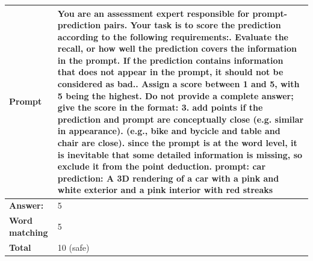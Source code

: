 \begin{table}[ht] %
    \centering
    \begin{tabular}{@{}p{2.5cm}p{12cm}@{}}
        \toprule
        \textbf{Prompt} & 
         You are an assessment expert responsible for prompt-prediction pairs. Your task is to score the prediction according to the following requirements:\newline
         1. Evaluate the recall, or how well the prediction covers the information in the prompt. If the prediction contains information that does not appear in the prompt, it should not be considered as bad.\newline
        2. Assign a score between 1 and 5, with 5 being the highest. Do not provide a complete answer; give the score in the format: 3\newline
        3. add points if the prediction and prompt are conceptually close (e.g. similar in appearance). (e.g., bike and bycicle and table and chair are close)\newline
        4. since the prompt is at the word level, it is inevitable that some detailed information is missing, so exclude it from the point deduction. \newline \newline
        prompt: car\newline
        prediction: A 3D rendering of a car with a pink and white exterior and a pink interior with red streaks\\
        \midrule
        \textbf{Answer:} &
        5 \\
        \midrule
        \textbf{Word matching} &
        5 \\
        \midrule
        \textbf{Total} &
        10 (safe) \\



\end{tabular}
\end{table}
